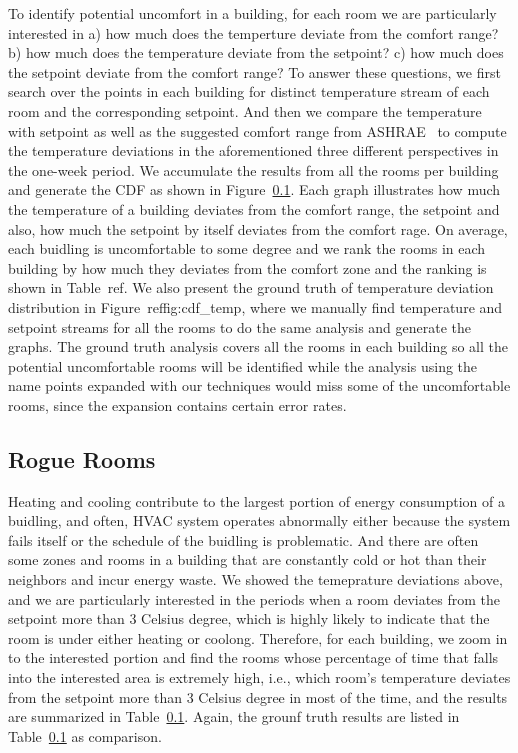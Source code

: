 To identify potential uncomfort in a building, for each room we are particularly interested in a) how much does the temperture deviate from the comfort range? b) how much does the temperature deviate from the setpoint? c) how much does the setpoint deviate from the comfort range? To answer these questions, we first search over the points in each building for distinct temperature stream of each room and the corresponding setpoint. And then we compare the temperature with setpoint as well as the suggested comfort range from ASHRAE~\cite{} to compute the temperature deviations in the aforementioned three different perspectives in the one-week period. We accumulate the results from all the rooms per building and generate the CDF as shown in Figure~\ref{}. Each graph illustrates how much the temperature of a building deviates from the comfort range, the setpoint and also, how much the setpoint by itself deviates from the comfort rage. On average, each buidling is uncomfortable to some degree and we rank the rooms in each building by how much they deviates from the comfort zone and the ranking is shown in Table~ref{}. We also present the ground truth of temperature deviation distribution in Figure~ref{fig:cdf_temp}, where we manually find temperature and setpoint streams for all the rooms to do the same analysis and generate the graphs. The ground truth analysis covers all the rooms in each building so all the potential uncomfortable rooms will be identified while the analysis using the name points expanded with our techniques would miss some of the uncomfortable rooms, since the expansion contains certain error rates.

\subsection{Rogue Rooms}
Heating and cooling contribute to the largest portion of energy consumption of a buidling, and often, HVAC system operates abnormally either because the system fails itself or the schedule of the buidling is problematic. And there are often some zones and rooms in a building that are constantly cold or hot than their neighbors and incur energy waste. We showed the temeprature deviations above, and we are particularly interested in the periods when a room deviates from the setpoint more than 3 Celsius degree, which is highly likely to indicate that the room is under either heating or coolong. Therefore, for each building, we zoom in to the interested portion and find the rooms whose percentage of time that falls into the interested area is extremely high, i.e., which room's temperature deviates from the setpoint more than 3 Celsius degree in most of the time, and the results are summarized in Table~\ref{}. Again, the grounf truth results are listed in Table~\ref{} as comparison.

